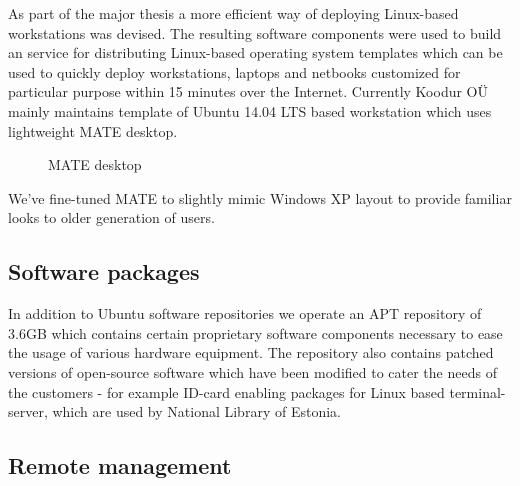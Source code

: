 \documentclass{article}
\begin{document}
As part of the major thesis a more efficient way of deploying Linux-based
workstations was devised.
The resulting software components were used to build an service for
distributing Linux-based operating system templates which can be used to
quickly deploy workstations, laptops and netbooks customized
for particular purpose within 15 minutes over the Internet.
Currently Koodur OÜ mainly maintains template of Ubuntu 14.04 LTS based
workstation which uses lightweight MATE desktop.

\begin{figure}[!htb]
\centering
{}
\caption{MATE desktop}
\label{fig:digraph}
\end{figure}

We've fine-tuned MATE to slightly mimic Windows XP layout to provide
familiar looks to older generation of users.

\subsection{Software packages}

In addition to Ubuntu software repositories 
we operate an APT repository of 3.6GB which contains
certain proprietary software components necessary
to ease the usage of various hardware equipment.
The repository also contains patched versions of
open-source software which have been modified to cater the
needs of the customers - for example
ID-card enabling packages for Linux based terminal-server,
which are used by National Library of Estonia.

\subsection{Remote management}
\end{document}
